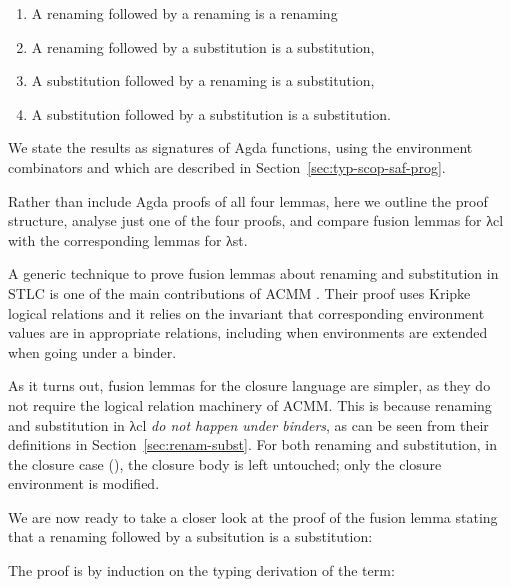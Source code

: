 \documentclass[bsc,frontabs,oneside,singlespacing,parskip,deptreport]{infthesis}
\theoremstyle{definition}
\theoremstyle{lemma}
\begin{document}
\begin{enumerate}[nolistsep]
  \item A renaming followed by a renaming is a renaming
  \item A renaming followed by a substitution is a substitution,
  \item A substitution followed by a renaming is a substitution,
  \item A substitution followed by a substitution is a substitution.
\end{enumerate}

We state the results as signatures of Agda functions, using the
environment combinators \AS{\_<\$>\_} and  which are described
in Section~\ref{sec:typ-scop-saf-prog}.


Rather than include Agda proofs of all four lemmas, here we outline
the proof structure, analyse just one of the four proofs, and compare
fusion lemmas for λcl with the corresponding lemmas for λst.

A generic technique to prove fusion lemmas about renaming and
substitution in STLC is one of the main contributions
of ACMM \cite{DBLP:conf/cpp/Allais0MM17}. Their proof uses Kripke
logical relations and it relies on the invariant that corresponding
environment values are in appropriate relations, including when
environments are extended when going under a binder.

As it turns out, fusion lemmas for the closure language are simpler,
as they do not require the logical relation machinery of ACMM. This is
because renaming and substitution in λcl \textit{do not happen under
  binders}, as can be seen from their definitions in
Section~\ref{sec:renam-subst}. For both renaming and substitution, in
the closure case (), the closure body is left untouched; only
the closure environment is modified.

We are now ready to take a closer look at the proof of the fusion
lemma stating that a renaming followed by a subsitution is a
substitution:


The proof is by induction on the typing derivation of the term:
\end{document}
